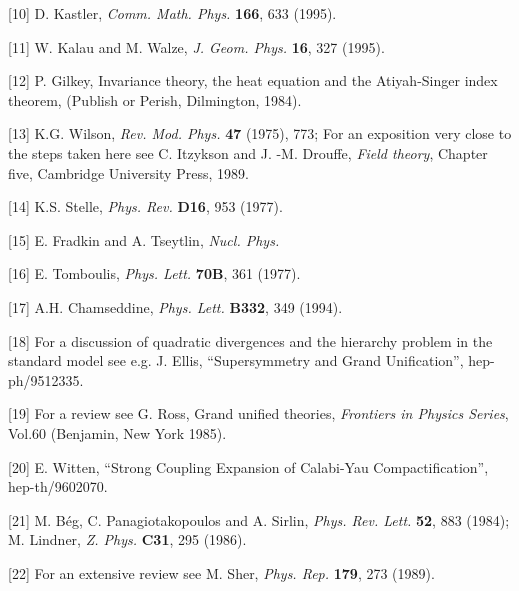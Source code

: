 \item{[10]} D. Kastler, {\it Comm. Math. Phys.} {\bf 166},
633 (1995).

\item{[11]} W. Kalau and M. Walze, {\it J. Geom. Phys.}
{\bf 16}, 327 (1995).

\item{[12]} P. Gilkey, Invariance theory, the heat
equation and the Atiyah-Singer index theorem, (Publish or
Perish, Dilmington, 1984).

\item{[13]} K.G. Wilson, {\it Rev. Mod. Phys.} {\bf 47}
(1975), 773; For an exposition very close to the steps taken
here see C. Itzykson and J. -M. Drouffe, {\it Field theory},
Chapter five, Cambridge University Press, 1989.

\item{[14]} K.S. Stelle, {\it Phys. Rev.} {\bf D16}, 953
(1977).

\item{[15]} E. Fradkin and A. Tseytlin, {\it Nucl. Phys.}

\item{[16]} E. Tomboulis, {\it Phys. Lett.} {\bf 70B},
361 (1977).

\item{[17]} A.H. Chamseddine, {\it Phys. Lett.} {\bf
B332}, 349 (1994).

\item{[18]} For a discussion of quadratic divergences and
the hierarchy problem in the standard model see e.g. J.
Ellis, ``Supersymmetry and Grand Unification'', hep-ph/9512335.

\item{[19]} For a review see G. Ross, Grand unified
theories, {\it Frontiers in Physics Series}, Vol.60
(Benjamin, New York 1985).

\item{[20]} E. Witten, ``Strong Coupling Expansion of Calabi-Yau
Compactification'', hep-th/9602070.

\item{[21]} M. B\'eg, C. Panagiotakopoulos and A. Sirlin,
{\it Phys. Rev. Lett.} {\bf 52}, 883 (1984); M. Lindner,
{\it Z. Phys.} {\bf C31}, 295 (1986).

\item{[22]} For an extensive review see M. Sher, {\it
Phys. Rep.} {\bf 179}, 273 (1989).


\bye
